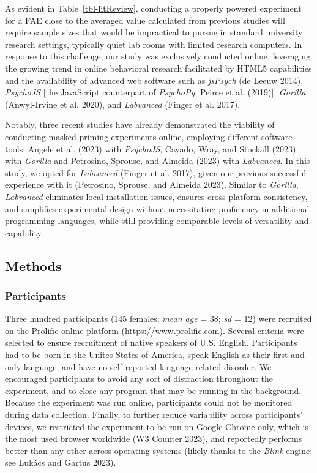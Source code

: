 \documentclass[
]{interact}
\begin{document}
As evident in Table~\ref{tbl-litReview}, conducting a properly powered
experiment for a FAE close to the averaged value calculated from
previous studies will require sample sizes that would be impractical to
pursue in standard university research settings, typically quiet lab
rooms with limited research computers. In response to this challenge,
our study was exclusively conducted online, leveraging the growing trend
in online behavioral research facilitated by HTML5 capabilities and the
availability of advanced web software such as \emph{jsPsych} (de Leeuw
2014), \emph{PsychoJS} {[}the JavaScript counterpart of \emph{PsychoPy};
Peirce et al. (2019){]}, \emph{Gorilla} (Anwyl-Irvine et al. 2020), and
\emph{Labvanced} (Finger et al. 2017).

Notably, three recent studies have already demonstrated the viability of
conducting masked priming experiments online, employing different
software tools: Angele et al. (2023) with \emph{PsychoJS}, Cayado, Wray,
and Stockall (2023) with \emph{Gorilla} and Petrosino, Sprouse, and
Almeida (2023) with \emph{Labvanced}. In this study, we opted for
\emph{Labvanced} (Finger et al. 2017), given our previous successful
experience with it (Petrosino, Sprouse, and Almeida 2023). Similar to
\emph{Gorilla}, \emph{Labvanced} eliminates local installation issues,
ensures cross-platform consistency, and simplifies experimental design
without necessitating proficiency in additional programming languages,
while still providing comparable levels of versatility and capability.

\subsection{Methods}\label{sec-exp1-methods}

\subsubsection{Participants}\label{sec-exp1-methods-participants}

Three hundred participants (145 females; \emph{mean age} = 38; \emph{sd}
= 12) were recruited on the Prolific online platform
(\url{https://www.prolific.com}). Several criteria were selected to
ensure recruitment of native speakers of U.S. English. Participants had
to be born in the Unites States of America, speak English as their first
and only language, and have no self-reported language-related disorder.
We encouraged participants to avoid any sort of distraction throughout
the experiment, and to close any program that may be running in the
background. Because the experiment was run online, participants could
not be monitored during data collection. Finally, to further reduce
variability across participants' devices, we restricted the experiment
to be run on Google Chrome only, which is the most used browser
worldwide (W3 Counter 2023), and reportedly performs better than any
other across operating systems (likely thanks to the \emph{Blink}
engine; see Lukács and Gartus 2023).
\end{document}
